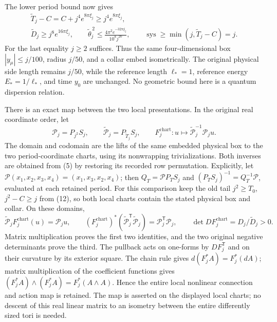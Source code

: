 \documentclass[
  11pt,
]{article}
\begin{document}
The lower period bound now gives \[
 \begin{gathered}
 \widetilde T_j-C=C+j^4e^{8\pi\xi_j}
                       \ge j^4e^{8\pi\xi_j},\\
 \widetilde D_j\ge j^8e^{16\pi\xi_j},\qquad
 \widetilde\theta_j^{\,2}
 \le\frac{4\pi^2e^{-32\pi\xi_j}}{10^8j^{20}},\qquad
 \operatorname{sys}\ge\min(j,\widetilde T_j-C)=j.
 \end{gathered}
 \tag{174}
\] For the last equality \(j\ge2\) suffices. Thus the same
four-dimensional box \(|y_\mu|\le j/100\), radius \(j/50\), and a collar
embed isometrically. The original physical side length remains \(j/50\),
while the reference length \(\ell_*=1\), reference energy
\(E_*=1/\ell_*\), and time \(y_0\) are unchanged. No geometric bound
here is a quantum dispersion relation.

There is an exact map between the two local presentations. In the
original real coordinate order, let \[
 \mathcal P_j=P_{j^2}S_j,\qquad
 \widetilde{\mathcal P}_j=P_{\widetilde T_j}S_j,
 \qquad
 F_j^{\mathrm{chart}}: u\longmapsto
             \widetilde{\mathcal P}_j^{-1}\mathcal P_j u.
 \tag{175}
\] The domain and codomain are the lifts of the same embedded physical
box to the two period-coordinate charts, using its nonwrapping
trivializations. Both inverses are obtained from (5) by restoring its
recorded row permutation. Explicitly, let \(\mathscr P(x_1,x_2,x_3,x_4)
=(x_1,x_3,x_2,x_4)\); then \(Q_T=\mathscr P P_TS_j\) and
\((P_TS_j)^{-1}=Q_T^{-1}\mathscr P\), evaluated at each retained period.
For this comparison keep the old tail \(j^2\ge T_0\), \(j^2-C\ge j\)
from (12), so both local charts contain the stated physical box and
collar. On these domains, \[
 \widetilde{\mathcal P}_j F_j^{\mathrm{chart}}(u)=\mathcal P_j u,
 \qquad
 (F_j^{\mathrm{chart}})^*
  (\widetilde{\mathcal P}_j^{\mathsf T}\widetilde{\mathcal P}_j)
  =\mathcal P_j^{\mathsf T}\mathcal P_j,
 \qquad
 \det DF_j^{\mathrm{chart}}=D_j/\widetilde D_j>0 .
 \tag{176}
\] Matrix multiplication proves the first two identities, and the two
original negative determinants prove the third. The pullback acts on
one-forms by \(DF_j^{\mathsf T}\) and on their curvature by its exterior
square. The chain rule gives \(d(F_j^*A)=F_j^*(dA)\); matrix
multiplication of the coefficient functions gives
\((F_j^*A)\wedge(F_j^*A)=F_j^*(A\wedge A)\). Hence the entire local
nonlinear connection and action map is retained. The map is asserted on
the displayed local charts; no descent of this real linear matrix to an
isometry between the entire differently sized tori is needed.
\end{document}
